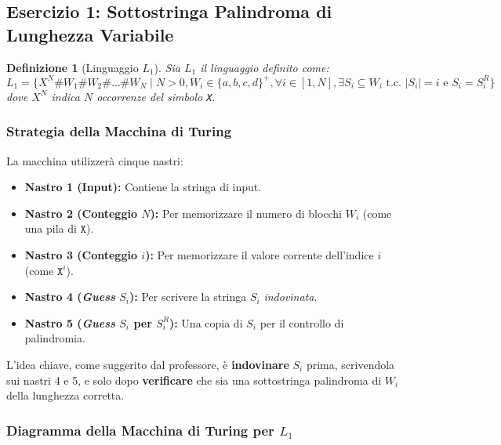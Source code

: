 \documentclass[a4paper]{article}
\newtheorem{definition}{Definizione}
\newcommand{\Sh}{\texttt{\#}} %
\newcommand{\X}{\texttt{X}} %
\begin{document}
\subsection{Esercizio 1: Sottostringa Palindroma di Lunghezza Variabile}

\begin{definition}[Linguaggio $L_1$]
Sia $L_1$ il linguaggio definito come:
\[
L_1 = \{ X^N \Sh W_1 \Sh W_2 \Sh \dots \Sh W_N \mid N > 0, W_i \in \{a,b,c,d\}^+, \forall i \in [1, N], \exists S_i \subseteq W_i \text{ t.c. } |S_i| = i \text{ e } S_i = S_i^R \}
\]
dove $X^N$ indica $N$ occorrenze del simbolo \texttt{X}.
\end{definition}

\subsubsection{Strategia della Macchina di Turing}
La macchina utilizzerà cinque nastri:
\begin{itemize}
    \item \textbf{Nastro 1 (Input):} Contiene la stringa di input.
    \item \textbf{Nastro 2 (Conteggio $N$):} Per memorizzare il numero di blocchi $W_i$ (come una pila di $\X$).
    \item \textbf{Nastro 3 (Conteggio $i$):} Per memorizzare il valore corrente dell'indice $i$ (come $\X^i$).
    \item \textbf{Nastro 4 (\textit{Guess} $S_i$):} Per scrivere la stringa $S_i$ \textit{indovinata}.
    \item \textbf{Nastro 5 (\textit{Guess} $S_i$ per $S_i^R$):} Una copia di $S_i$ per il controllo di palindromia.
\end{itemize}
L'idea chiave, come suggerito dal professore, è \textbf{indovinare} $S_i$ prima, scrivendola sui nastri 4 e 5, e solo dopo \textbf{verificare} che sia una sottostringa palindroma di $W_i$ della lunghezza corretta.

\subsubsection{Diagramma della Macchina di Turing per $L_1$}
\end{document}
